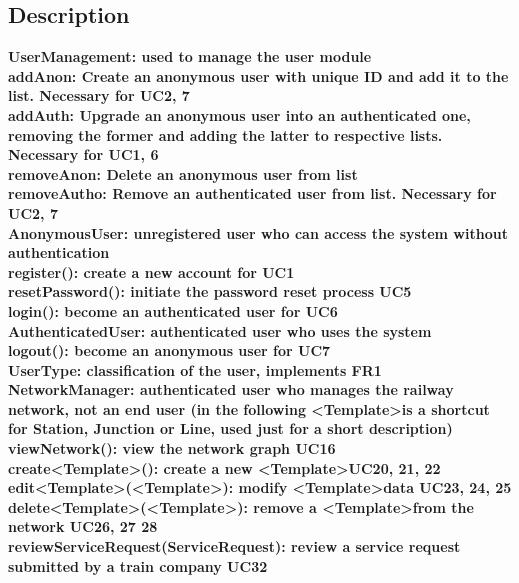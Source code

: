 \subsection*{Description}


\bf{UserManagement}: used to manage the user module\\

addAnon: Create an anonymous user with unique ID and add it to the list. Necessary for UC2, 7\\
addAuth: Upgrade an anonymous user into an authenticated one, removing the former and adding the latter to respective lists. Necessary for UC1, 6\\
removeAnon: Delete an anonymous user from list\\
removeAutho: Remove an authenticated user from list. Necessary for UC2, 7\\

\bf{AnonymousUser}: unregistered user who can access the system without authentication \\

register(): create a new account for UC1\\
resetPassword(): initiate the password reset process UC5\\
login(): become an authenticated user for UC6\\

\bf{AuthenticatedUser}: authenticated user who uses the system \\

logout(): become an anonymous user for UC7\\

\bf{UserType}: classification of the user, implements FR1\\

\bf{NetworkManager}: authenticated user who manages the railway network, not an end user
(in the following \textless Template\textgreater is a shortcut for Station, Junction or Line, used just for a short description)\\
 
viewNetwork(): view the network graph UC16\\
create\textless Template\textgreater (): create a new \textless Template\textgreater  UC20, 21, 22\\
edit\textless Template\textgreater (\textless Template\textgreater ): modify \textless Template\textgreater data UC23, 24, 25\\
delete\textless Template\textgreater(\textless Template\textgreater): remove a \textless Template\textgreater from the network UC26, 27 28\\
reviewServiceRequest(ServiceRequest): review a service request submitted by a train company UC32\\

